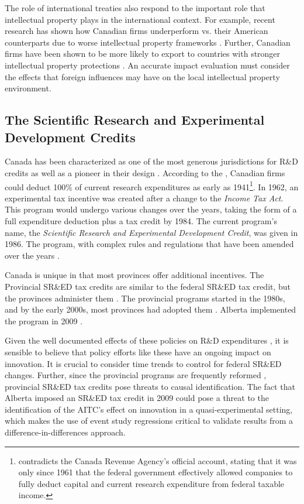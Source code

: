 \documentclass[../main.tex]{subfiles}
\begin{document}
The role of international treaties also respond to the important role that intellectual property plays in the international context. For example, recent research has shown how Canadian firms underperform vs. their American counterparts due to worse intellectual property frameworks \parencite{carew_etal06}. Further, Canadian firms have been shown to be more likely to export to countries with stronger intellectual property protections \parencite{rafiquzzaman02}. An accurate impact evaluation must consider the effects that foreign influences may have on the local intellectual property environment.

\subsection{The Scientific Research and Experimental Development Credits}

Canada has been characterized as one of the most generous jurisdictions for R\&D credits \parencite{mckenzie08} as well as a pioneer in their design \parencite{mansfield_switzer85a}. According to the \textcite{canadarevenueagency23}, Canadian firms could deduct 100\% of current research expenditures as early as 1941\footnote{\textcite{mansfield_switzer85a} contradicts the Canada Revenue Agency's official account, stating that it was only since 1961 that the federal government effectively allowed companies to fully deduct capital and current research expenditure from federal taxable income.}. In 1962, an experimental tax incentive was created after a change to the \textit{Income Tax Act}. This program would undergo various changes over the years, taking the form of a full expenditure deduction plus a tax credit by 1984. The current program's name, the \textit{Scientific Research and Experimental Development Credit}, was given in 1986. The program, with complex rules and regulations that have been amended over the years \parencite{canadarevenueagency15}.

Canada is unique in that most provinces offer additional incentives. The Provincial SR\&ED tax credits are similar to the federal SR\&ED tax credit, but the provinces administer them \parencite{warda00}. The provincial programs started in the 1980s, and by the early 2000s, most provinces had adopted them \parencite{warda98,mckenzie05}. Alberta implemented the program in 2009 \parencite{brouillete13}.

Given the well documented effects of these policies on R\&D expenditures \parencite{mansfield_switzer85b, agrawal_etal20, becker15}, it is sensible to believe that policy efforts like these have an ongoing impact on innovation. It is crucial to consider time trends to control for federal SR\&ED changes. Further, since the provincial programs are frequently reformed \parencite{mckenzie05}, provincial SR\&ED tax credits pose threats to causal identification. The fact that Alberta imposed an SR\&ED tax credit in 2009 could pose a threat to the identification of the AITC's effect on innovation in a quasi-experimental setting, which makes the use of event study regressions critical to validate results from a difference-in-differences approach.
\end{document}
